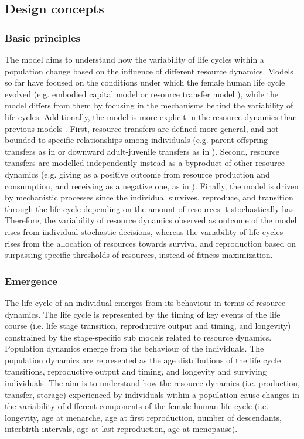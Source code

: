 \documentclass{article}
\begin{document}
\subsection{Design concepts}

\subsubsection{Basic principles}

The model aims to understand how the variability of life cycles within a population change based on the influence of different resource dynamics. Models so far have focused on the conditions under which the female human life cycle evolved (e.g. embodied capital model \citep{kaplan1996theory} or resource transfer model \citep{chu2006co}), while the model differs from them by focusing in the mechanisms behind the variability of life cycles. Additionally, the model is more explicit in the resource dynamics than previous models \citep{price2020fitness,kaplan1996theory,chu2006co,lee2003rethinking,kramer2010pooled, van1986acquisition}. First, resource transfers are defined more general, and not bounded to specific relationships among individuals (e.g. parent-offspring transfers as in \cite{kaplan1996theory} or downward adult-juvenile transfers as in \cite{chu2006co}). Second, resource transfers are modelled independently instead as a byproduct of other resource dynamics (e.g. giving as a positive outcome from resource production and consumption, and receiving as a negative one, as in \cite{lee2003rethinking,chu2006co}). Finally, the model is driven by mechanistic processes since the individual survives, reproduce, and transition through the life cycle depending on the amount of resources it stochastically has. Therefore, the variability of resource dynamics observed as outcome of the model rises from individual stochastic decisions, whereas the variability of life cycles rises from the allocation of resources towards survival and reproduction based on surpassing specific thresholds of resources, instead of fitness maximization.

\subsubsection{Emergence}

The life cycle of an individual emerges from its behaviour in terms of resource dynamics. The life cycle is represented by the timing of key events of the life course (i.e. life stage transition, reproductive output and timing, and longevity) constrained by the stage-specific sub models related to resource dynamics. Population dynamics emerge from the behaviour of the individuals. The population dynamics are represented as the age distributions of the life cycle transitions, reproductive output and timing, and longevity and surviving individuals. The aim is to understand how the resource dynamics (i.e. production, transfer, storage) experienced by individuals within a population cause changes in the variability of different components of the female human life cycle (i.e. longevity, age at menarche, age at first reproduction, number of descendants, interbirth intervals, age at last reproduction, age at menopause).
\end{document}
